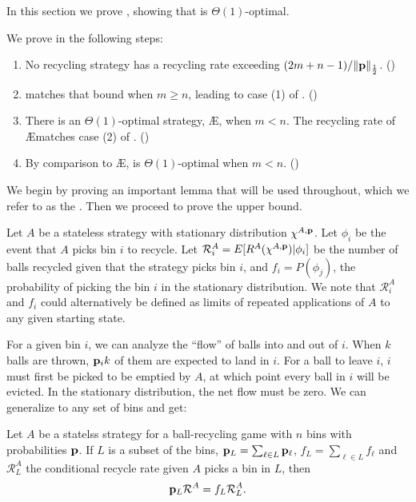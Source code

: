 

In this section we prove , showing that \RB{} is
$\Theta(1)$-optimal. 

We prove  in the following steps:
\begin{enumerate}
	\item No recycling strategy has a recycling rate exceeding
		$(2m+n-1)/\|\mathbf{p}\|_{\frac{1}{2}}$. ()
	\item \RB{} matches that bound when $m \geq n$, leading to case (1) of
		. ()
	\item There is an $\Theta(1)$-optimal strategy, \AE{}, when $m < n$. The
		recycling rate of \AE matches case (2) of .
		()
	\item By comparison to \AE{}, \RB{} is $\Theta(1)$-optimal when $m < n$.
		()
\end{enumerate}

We begin by proving an important lemma that will be used throughout, which we
refer to as the . Then we proceed to prove the upper bound.

Let $A$ be a stateless strategy with stationary distribution $\chi^{A,\mathbf{p}}$. Let
$\phi_i$ be the event that $A$ picks bin $i$ to recycle. Let $\mathcal{R}_i^A =
E[R^A(\chi^{A,\mathbf{p}}) | \phi_i]$ be the number of balls recycled given that the
strategy picks bin $i$, and $f_i = P(\phi_j)$, the probability of picking the
bin $i$ in the stationary distribution. We note that $\mathcal{R}_i^A$ and
$f_i$ could alternatively be defined as limits of repeated applications of $A$
to any given starting state.

For a given bin $i$, we can analyze the ``flow'' of balls into and out of $i$.
When $k$ balls are thrown, $\mathbf{p}_ik$ of them are expected to land in $i$. For a
ball to leave $i$, $i$ must first be picked to be emptied by $A$, at which
point every ball in $i$ will be evicted. In the stationary distribution, the
net flow must be zero.  We can generalize to any set of bins and get:

\begin{lemma} \label{lem:gen-flow-equation}
	Let $A$ be a statelss strategy for a ball-recycling game with $n$ bins with
	probabilities $\mathbf{p}$. If $L$ is a subset of the bins, $\mathbf{p}_L = \sum_{\ell \in
	L} \mathbf{p}_\ell$, $f_L = \sum_{\ell \in L} f_\ell$ and $\mathcal{R}_L^A$ the
	conditional recycle rate given $A$ picks a bin in $L$, then
	\begin{equation}
		\mathbf{p}_L\mathcal{R}^A = f_L\mathcal{R}_L^A.
	\end{equation}
\end{lemma}

